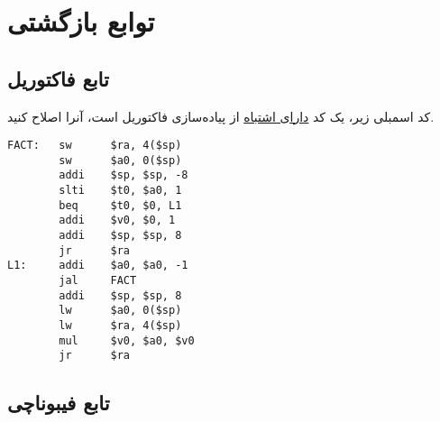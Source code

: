 \documentclass[11pt, dvipsnames, svgnames, x11names]{article}
\begin{document}
\section{توابع بازگشتی}
\subsection{تابع فاکتوریل}
کد اسمبلی زیر، یک کد \underline{دارای اشتباه} از پیاده‌سازی فاکتوریل است، آنرا اصلاح کنید.

\begin{latin}
\begin{lstlisting}[keywords={sw, addi, slti, beq, jr, jal, lw, mul}]
FACT:   sw      $ra, 4($sp)
        sw      $a0, 0($sp)
        addi    $sp, $sp, -8
        slti    $t0, $a0, 1
        beq     $t0, $0, L1
        addi    $v0, $0, 1
        addi    $sp, $sp, 8
        jr      $ra
L1:     addi    $a0, $a0, -1
        jal     FACT
        addi    $sp, $sp, 8
        lw      $a0, 0($sp)
        lw      $ra, 4($sp)
        mul     $v0, $a0, $v0
        jr      $ra
\end{lstlisting}
\end{latin}
\subsection{تابع فیبوناچی}
\end{document}
